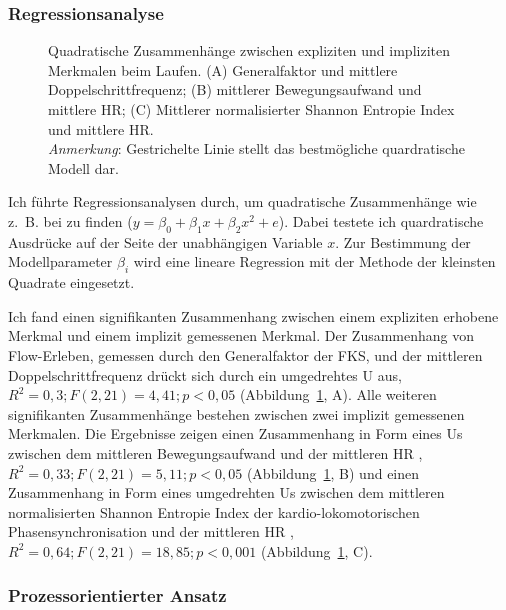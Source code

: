 \subsubsection{Regressionsanalyse} 

\label{ssub:regressionsanalyse} 
\begin{figure}
	[!htb]  \caption[Quadratische Zusammenhänge zwischen expliziten und impliziten Merkmalen beim Laufen.]{Quadratische Zusammenhänge zwischen expliziten und impliziten Merkmalen beim Laufen. (A) Generalfaktor und mittlere Doppelschrittfrequenz; (B) mittlerer Bewegungsaufwand und mittlere HR; (C) Mittlerer normalisierter Shannon Entropie Index und mittlere HR.\\
	\hspace{ 
	\textwidth}\emph{Anmerkung}: Gestrichelte Linie stellt das bestmögliche quardratische Modell dar.} \label{fig:regressionsanalyse_1} 
\end{figure}

Ich führte Regressionsanalysen durch, um quadratische Zusammenhänge wie z.~B. bei \citet{Peifer2014} zu finden ($y=\beta_{0}+\beta_{1}x+\beta_{2}x^{2}+e$). Dabei testete ich quardratische Ausdrücke auf der Seite der unabhängigen Variable $x$. Zur Bestimmung der Modellparameter $\beta_i$ wird eine lineare Regression mit der Methode der kleinsten Quadrate eingesetzt. 

Ich fand einen signifikanten Zusammenhang zwischen einem expliziten erhobene Merkmal und einem implizit gemessenen Merkmal. Der Zusammenhang von Flow-Erleben, gemessen durch den Generalfaktor der \ac{FKS}, und der mittleren Doppelschrittfrequenz drückt sich durch ein umgedrehtes U aus, $R^2 = 0{,}3; F(2, 21) = 4{,}41; p < 0{,}05$ (Abbildung~\ref{fig:regressionsanalyse_1}, A). Alle weiteren signifikanten Zusammenhänge bestehen zwischen zwei implizit gemessenen Merkmalen. Die Ergebnisse zeigen einen Zusammenhang in Form eines Us zwischen dem mittleren Bewegungsaufwand und der mittleren HR , $R^2 = 0{,}33; F(2, 21) = 5{,}11; p < 0{,}05$ (Abbildung~\ref{fig:regressionsanalyse_1}, B) und einen Zusammenhang in Form eines umgedrehten Us zwischen dem mittleren normalisierten Shannon Entropie Index der kardio-lokomotorischen Phasensynchronisation und der mittleren HR , $R^2 = 0{,}64; F(2, 21) = 18{,}85; p < 0{,}001$ (Abbildung~\ref{fig:regressionsanalyse_1}, C).

\subsubsection{Prozessorientierter Ansatz} 

